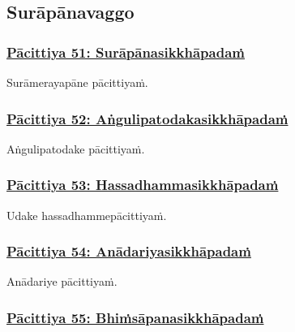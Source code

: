 \subsection{Surāpānavaggo}

\subsubsection*{\hyperref[exp51]{Pācittiya 51: Surāpānasikkhāpadaṁ}}
\label{pac51}

Surāmerayapāne pācittiyaṁ.



\subsubsection*{\hyperref[exp52]{Pācittiya 52: Aṅgulipatodakasikkhāpadaṁ}}
\label{pac52}

Aṅgulipatodake pācittiyaṁ.



\subsubsection*{\hyperref[exp53]{Pācittiya 53: Hassadhammasikkhāpadaṁ}}
\label{pac53}

Udake hassadhamme\makeatletter\hyperlink{endnote327-appendix}\makeatother \thinspace pācittiyaṁ.



\subsubsection*{\hyperref[exp54]{Pācittiya 54: Anādariyasikkhāpadaṁ}}
\label{pac54}

Anādariye pācittiyaṁ.



\subsubsection*{\hyperref[exp55]{Pācittiya 55: Bhiṁsāpanasikkhāpadaṁ}}
\label{pac55}


